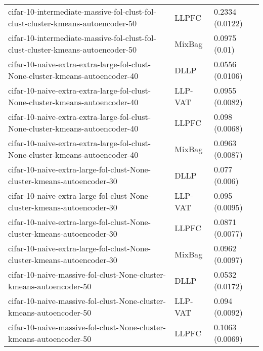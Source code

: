 \begin{longtable}{lll}
                              cifar-10-intermediate-massive-fol-clust-fol-clust-cluster-kmeans-autoencoder-50 &     LLPFC &                       0.2334 (0.0122) \\
                              cifar-10-intermediate-massive-fol-clust-fol-clust-cluster-kmeans-autoencoder-50 &    MixBag &                         0.0975 (0.01) \\
                                cifar-10-naive-extra-extra-large-fol-clust-None-cluster-kmeans-autoencoder-40 &      DLLP &                       0.0556 (0.0106) \\
                                cifar-10-naive-extra-extra-large-fol-clust-None-cluster-kmeans-autoencoder-40 &   LLP-VAT &                       0.0955 (0.0082) \\
                                cifar-10-naive-extra-extra-large-fol-clust-None-cluster-kmeans-autoencoder-40 &     LLPFC &                        0.098 (0.0068) \\
                                cifar-10-naive-extra-extra-large-fol-clust-None-cluster-kmeans-autoencoder-40 &    MixBag &                       0.0963 (0.0087) \\
                                      cifar-10-naive-extra-large-fol-clust-None-cluster-kmeans-autoencoder-30 &      DLLP &                         0.077 (0.006) \\
                                      cifar-10-naive-extra-large-fol-clust-None-cluster-kmeans-autoencoder-30 &   LLP-VAT &                        0.095 (0.0095) \\
                                      cifar-10-naive-extra-large-fol-clust-None-cluster-kmeans-autoencoder-30 &     LLPFC &                       0.0871 (0.0077) \\
                                      cifar-10-naive-extra-large-fol-clust-None-cluster-kmeans-autoencoder-30 &    MixBag &                       0.0962 (0.0097) \\
                                          cifar-10-naive-massive-fol-clust-None-cluster-kmeans-autoencoder-50 &      DLLP &                       0.0532 (0.0172) \\
                                          cifar-10-naive-massive-fol-clust-None-cluster-kmeans-autoencoder-50 &   LLP-VAT &                        0.094 (0.0092) \\
                                          cifar-10-naive-massive-fol-clust-None-cluster-kmeans-autoencoder-50 &     LLPFC &                       0.1063 (0.0069) \\

\end{longtable}
